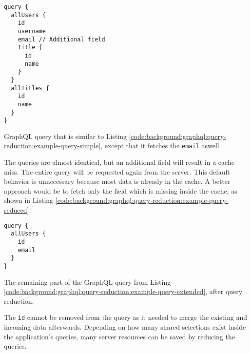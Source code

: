 \ifshowListings
\begin{listing}[H]
    \begin{verbatim}
query {
  allUsers {
    id
    username
    email // Additional field
    Title {
      id
      name
    }
  }
  allTitles {
    id
    name
  }
}
    \end{verbatim}
    \caption{GraphQL query that is similar to Listing \ref{code:background:graphql:query-reduction:example-query-simple}, except that it fetches the \texttt{email} aswell.}\label{code:background:graphql:query-reduction:example-query-extended}
\end{listing}
\fi

\noindent The queries are almost identical, but an additional field will result in a cache miss. The entire query will be requested again from the server. This default behavior is unnecessary because most data is already in the cache. A better approach would be to fetch only the field which is missing inside the cache, as shown in Listing \ref{code:background:graphql:query-reduction:example-query-reduced}.

\ifshowListings
\begin{listing}[H]
  \begin{verbatim}
query {
  allUsers {
    id
    email
  }
}
  \end{verbatim}
  \caption{The remaining part of the GraphQL query from Listing \ref{code:background:graphql:query-reduction:example-query-extended}, after query reduction.}\label{code:background:graphql:query-reduction:example-query-reduced}
\end{listing}
\fi

\noindent The \texttt{id} cannot be removed from the query as it needed to merge the existing and incoming data afterwards. Depending on how many shared selections exist inside the application's queries, many server resources can be saved by reducing the queries.
